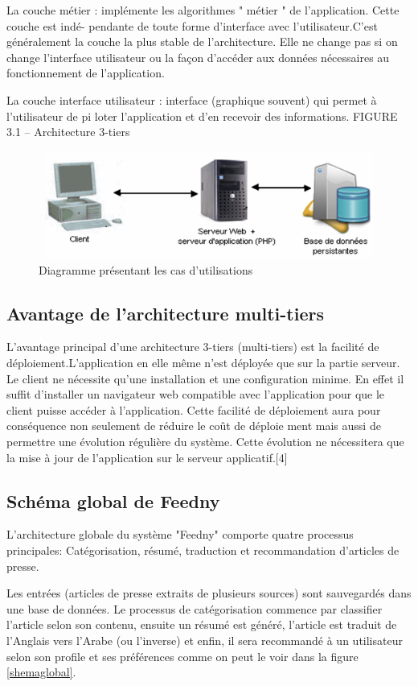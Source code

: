 La couche métier : implémente les algorithmes " métier " de l'application. Cette couche est indé-
pendante de toute forme d'interface avec l'utilisateur.C'est généralement la couche la plus
stable de l'architecture. Elle ne change pas si on change l'interface utilisateur ou la façon
d'accéder aux données nécessaires au fonctionnement de l'application.

La couche interface utilisateur : interface (graphique souvent) qui permet à l'utilisateur de pi
loter l'application et d'en recevoir des informations.
FIGURE 3.1 – Architecture 3-tiers

\begin{figure}[H]
    \centering
    \includegraphics[height=100pt,width=400pt]{img/chapter3/tiers.png}
    \caption{Diagramme présentant les cas d'utilisations}
\end{figure}

\subsection{Avantage de l'architecture multi-tiers}
L'avantage principal d'une architecture 3-tiers (multi-tiers) est la facilité de déploiement.L'application
en elle même n'est déployée que sur la partie serveur.
Le client ne nécessite qu'une installation et une configuration minime.
En effet il suffit d'installer un navigateur web compatible avec l'application pour que le client
puisse accéder à l'application.
Cette facilité de déploiement aura pour conséquence non seulement de réduire le coût de déploie
ment mais aussi de permettre une évolution régulière du système. Cette évolution ne nécessitera
que la mise à jour de l'application sur le serveur applicatif.[4]

\subsection{Schéma global de \textquotedbl Feedny\textquotedbl}
L'architecture globale du système "Feedny" comporte quatre processus principales: Catégorisation, résumé, traduction et recommandation d'articles de presse.

Les entrées (articles de presse extraits de plusieurs sources) sont sauvegardés dans une base de données. Le processus de catégorisation commence par classifier l'article selon son contenu, ensuite un résumé est généré, l'article est traduit de l'Anglais vers l'Arabe (ou l'inverse) et enfin, il sera recommandé à un utilisateur selon son profile et ses préférences comme on peut le voir dans la figure \ref{shemaglobal}.

